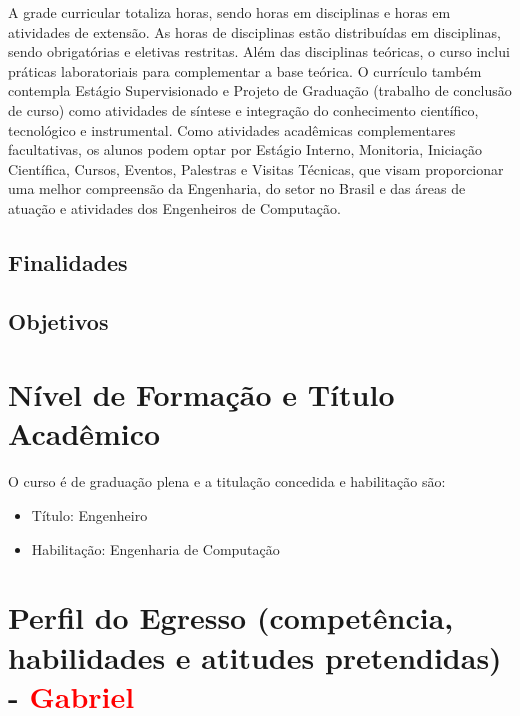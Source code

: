 A grade curricular totaliza \totalhoras horas, sendo \hobrigatorias horas em disciplinas e \hextensao horas em atividades de extensão. As \hobrigatorias horas de disciplinas estão distribuídas em \ndisciplinas disciplinas, sendo \nobrigatorias  obrigatórias e \neletivas eletivas restritas. Além das disciplinas teóricas, o curso inclui práticas laboratoriais para complementar a base teórica. O currículo também contempla Estágio Supervisionado e Projeto de Graduação (trabalho de conclusão de curso) como atividades de síntese e integração do conhecimento científico, tecnológico e instrumental. Como atividades acadêmicas complementares facultativas, os alunos podem optar por Estágio Interno, Monitoria, Iniciação Científica, Cursos, Eventos, Palestras e Visitas Técnicas, que visam proporcionar uma melhor compreensão da Engenharia, do setor no Brasil e das áreas de atuação e atividades dos Engenheiros de Computação.

\subsection{Finalidades}

\subsection{Objetivos}

\section{Nível de Formação e Título Acadêmico}

O curso é de graduação plena e a titulação concedida e habilitação são:

\begin{itemize}
\item{Título: Engenheiro}
\item{Habilitação: Engenharia de Computação}
\end{itemize}

\section{Perfil do Egresso (competência, habilidades e atitudes pretendidas) - \textcolor{red}{Gabriel}}


